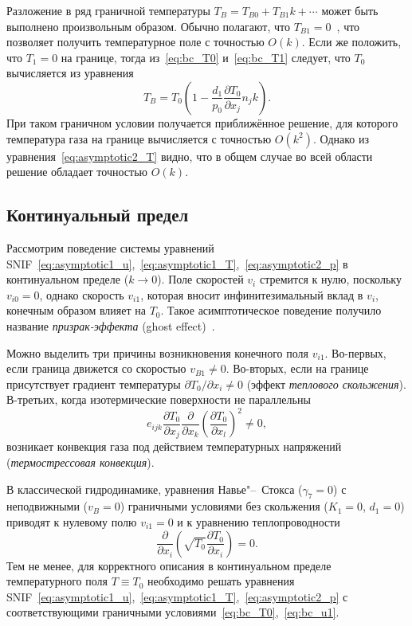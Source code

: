 \documentclass[10pt]{article}
\newcommand{\pder}[2][]{\frac{\partial#1}{\partial#2}}
\newcommand{\Pder}[2][]{\partial#1/\partial#2}
\newcommand{\OO}[1]{O(#1)}
\begin{document}
Разложение в ряд граничной температуры \(T_B = T_{B0} + T_{B1}k + \cdots\) может быть выполнено
произвольным образом. Обычно полагают, что \(T_{B1}=0\)~\cite{Kogan1976, Sone1996},
что позволяет получить температурное поле с точностью \(\OO{k}\).
Если же положить, что \(T_1=0\) на границе,
тогда из~\eqref{eq:bc_T0} и~\eqref{eq:bc_T1} следует,
что \(T_0\) вычисляется из уравнения
\begin{equation}\label{eq:boundary_temp}
    T_B = T_0 \left( 1 - \frac{d_1}{p_0}\pder[T_0]{x_j}n_j k \right).
\end{equation}
При таком граничном условии получается приближённое решение,
для которого температура газа на границе вычисляется с точностью \(\OO{k^2}\).
Однако из уравнения~\eqref{eq:asymptotic2_T} видно, что в общем случае во всей области
решение обладает точностью \(\OO{k}\).

\subsection{Континуальный предел}

Рассмотрим поведение системы уравнений SNIF~\eqref{eq:asymptotic1_u},~\eqref{eq:asymptotic1_T},~\eqref{eq:asymptotic2_p}
в континуальном пределе (\(k\to0\)).
Поле скоростей \(v_i\) стремится к нулю, поскольку \(v_{i0}=0\),
однако скорость \(v_{i1}\), которая вносит инфинитезимальный вклад в \(v_i\),
конечным образом влияет на \(T_0\).
Такое асимптотическое поведение получило название \emph{призрак-эффекта} (ghost effect)~\cite{Sone2002, Sone2007}.

Можно выделить три причины возникновения конечного поля \(v_{i1}\).
Во-первых, если граница движется со скоростью \(v_{B1}\ne0\).
Во-вторых, если на границе присутствует градиент температуры \(\Pder[T_0]{x_i}\ne0\) (эффект \emph{теплового скольжения}).
В-третьих, когда изотермические поверхности не параллельны
\begin{equation}\label{eq:nonparallel}
    e_{ijk}\pder[T_0]{x_j}\pder{x_k}\left(\pder[T_0]{x_l}\right)^2 \ne 0,
\end{equation}
возникает конвекция газа под действием температурных напряжений (\emph{термострессовая конвекция}).

В классической гидродинамике, уравнения Навье"--~Стокса (\(\gamma_7=0\))
с неподвижными (\(v_B=0\)) граничными условиями без скольжения (\(K_1=0\), \(d_1=0\))
приводят к нулевому полю \(v_{i1} = 0\) и к уравнению теплопроводности
\begin{equation}\label{eq:heat_equation}
    \pder{x_i}\left(\sqrt{T_0}\pder[T_0]{x_i}\right) = 0.
\end{equation}
Тем не менее, для корректного описания в континуальном пределе температурного поля \(T\equiv T_0\)
необходимо решать уравнения SNIF~\eqref{eq:asymptotic1_u},~\eqref{eq:asymptotic1_T},~\eqref{eq:asymptotic2_p}
с соответствующими граничными условиями~\eqref{eq:bc_T0},~\eqref{eq:bc_u1}.
\end{document}
